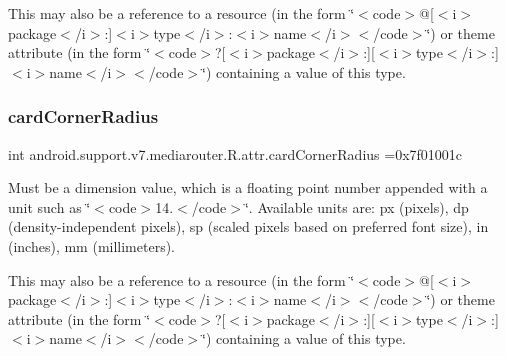 This may also be a reference to a resource (in the form \char`\"{}$<$code$>$@\mbox{[}$<$i$>$package$<$/i$>$\+:\mbox{]}$<$i$>$type$<$/i$>$\+:$<$i$>$name$<$/i$>$$<$/code$>$\char`\"{}) or theme attribute (in the form \char`\"{}$<$code$>$?\mbox{[}$<$i$>$package$<$/i$>$\+:\mbox{]}\mbox{[}$<$i$>$type$<$/i$>$\+:\mbox{]}$<$i$>$name$<$/i$>$$<$/code$>$\char`\"{}) containing a value of this type. \mbox{\label{classandroid_1_1support_1_1v7_1_1mediarouter_1_1R_1_1attr_a3789fe824c1a499701cd9905dd1671de}} 
\subsubsection{\texorpdfstring{card\+Corner\+Radius}{cardCornerRadius}}
{\footnotesize\ttfamily int android.\+support.\+v7.\+mediarouter.\+R.\+attr.\+card\+Corner\+Radius =0x7f01001c\hspace{0.3cm}{\ttfamily [static]}}

Must be a dimension value, which is a floating point number appended with a unit such as \char`\"{}$<$code$>$14.\+5sp$<$/code$>$\char`\"{}. Available units are\+: px (pixels), dp (density-\/independent pixels), sp (scaled pixels based on preferred font size), in (inches), mm (millimeters). 

This may also be a reference to a resource (in the form \char`\"{}$<$code$>$@\mbox{[}$<$i$>$package$<$/i$>$\+:\mbox{]}$<$i$>$type$<$/i$>$\+:$<$i$>$name$<$/i$>$$<$/code$>$\char`\"{}) or theme attribute (in the form \char`\"{}$<$code$>$?\mbox{[}$<$i$>$package$<$/i$>$\+:\mbox{]}\mbox{[}$<$i$>$type$<$/i$>$\+:\mbox{]}$<$i$>$name$<$/i$>$$<$/code$>$\char`\"{}) containing a value of this type. \mbox{\label{classandroid_1_1support_1_1v7_1_1mediarouter_1_1R_1_1attr_a4a3eb8639f587203282b0890b75e5057}} 
